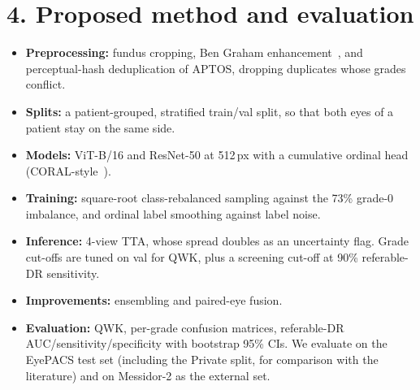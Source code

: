 \documentclass[10pt]{article}
\begin{document}
\section*{4. Proposed method and evaluation}
\begin{itemize}
\item \textbf{Preprocessing:} fundus cropping, Ben Graham enhancement~\cite{graham}, and perceptual-hash deduplication of APTOS, dropping duplicates whose grades conflict.
\item \textbf{Splits:} a patient-grouped, stratified train/val split, so that both eyes of a patient stay on the same side.
\item \textbf{Models:} ViT-B/16 and ResNet-50 at 512\,px with a cumulative ordinal head (CORAL-style~\cite{coral}).
\item \textbf{Training:} square-root class-rebalanced sampling against the 73\% grade-0 imbalance, and ordinal label smoothing against label noise.
\item \textbf{Inference:} 4-view TTA, whose spread doubles as an uncertainty flag. Grade cut-offs are tuned on val for QWK, plus a screening cut-off at 90\% referable-DR sensitivity.
\item \textbf{Improvements:} ensembling and paired-eye fusion.
\item \textbf{Evaluation:} QWK, per-grade confusion matrices, referable-DR AUC/sensitivity/specificity with bootstrap 95\% CIs. We evaluate on the EyePACS test set (including the Private split, for comparison with the literature) and on Messidor-2 as the external set.
\end{itemize}
\end{document}
